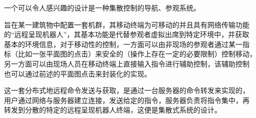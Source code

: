 一个可以令人感兴趣的设计是一种集散控制的导航、参观系统。

旨在某一建筑物中配置一套机群，其移动终端为可移动的并且具有网络传输功能
的“远程呈现机器人”，其基本功能是代替参观者虚拟出席到特定环境中，并获取
基本的环境信息，对于移动性的控制，一方面可以由非现场的参观者通过某一指
标（比如一张平面图的点击）来安全的（操作上存在一定的必要限制）控制移动，
另一方面可以由现场人员在移动终端上直接输入指令进行辅助控制，该辅助控制
也可以通过前述的平面图点击来封装化的实现。

这一套分布式地远程命令发送与获取，是通过一台服务器的命令转发来实现的，
用户通过网络与服务器建立连接，发送给定的指令，服务器负责将指令集中，再
转发到分散的特定的远程呈现机器人终端，这便是集散式系统的设计。
